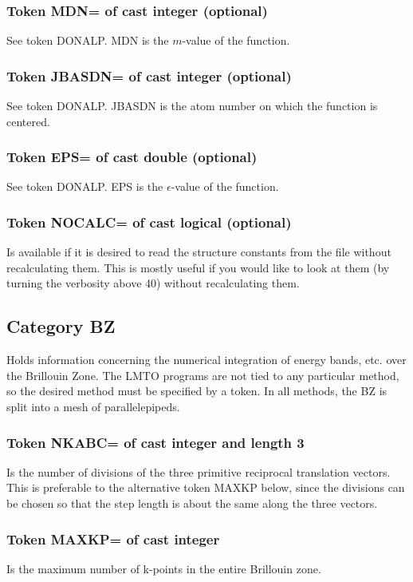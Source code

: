 \documentclass[aps,twocolumn,a4]{revtex4}
\begin{document}
\subsubsection{Token MDN= of cast integer (optional)}
See token DONALP. MDN is the $m$-value of the function.

\subsubsection{Token JBASDN= of cast integer (optional)}
See token DONALP. JBASDN is the atom number on which the function
is centered.

\subsubsection{Token EPS= of cast double (optional)}
See token DONALP. EPS is the $\epsilon$-value of the function.

\subsubsection{Token NOCALC= of cast logical (optional)}
Is available if it is desired to read the structure
constants from the file without recalculating them.  This is mostly
useful if you would like to look at them (by turning the
verbosity above 40) without recalculating them.

\subsection{Category BZ}
Holds information concerning the numerical integration of
energy bands, etc. over the Brillouin Zone.  The LMTO programs are not
tied to any particular method, so the desired method must be specified
by a token. In all
methods, the BZ is split into a mesh of parallelepipeds.

\subsubsection{Token NKABC= of cast integer and length 3}
Is the number of divisions of the three primitive
reciprocal translation vectors.  This is preferable to the alternative
token MAXKP below, since the divisions
can be chosen so that the step length is about the same along the three
vectors.

\subsubsection{Token MAXKP= of cast integer}
Is the maximum number of k-points in the entire Brillouin zone.
\end{document}
